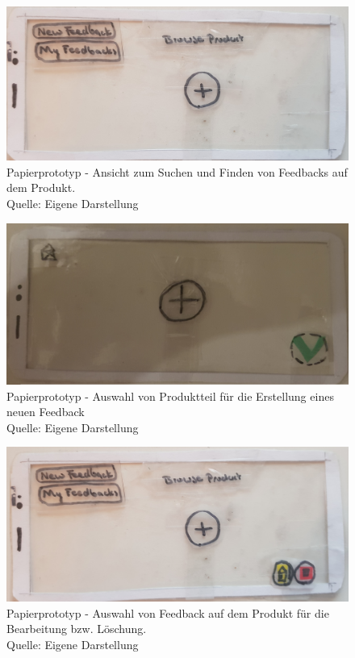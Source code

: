 \begin{figure}[H]
	\centering
	\includegraphics[width=.7\textwidth]{resources/conception/lowfi_browseOnProduct.jpg}
	\caption{Papierprototyp - Ansicht zum Suchen und Finden von Feedbacks auf dem Produkt. \\Quelle: Eigene Darstellung}
	\label{img:sysstem_sketch}
\end{figure}

\begin{figure}[H]
	\centering
	\includegraphics[width=.7\textwidth]{resources/conception/lowfi_create.jpg}
	\caption{Papierprototyp - Auswahl von Produktteil für die Erstellung eines neuen Feedback \\Quelle: Eigene Darstellung}
	\label{img:ppcreate}
\end{figure}

\begin{figure}[H]
	\centering
	\includegraphics[width=.7\textwidth]{resources/conception/lowfi_edit_delete.jpg}
	\caption{Papierprototyp - Auswahl von Feedback auf dem Produkt für die Bearbeitung bzw. Löschung. \\Quelle: Eigene Darstellung}
	\label{img:sysstem_sketch}
\end{figure}


